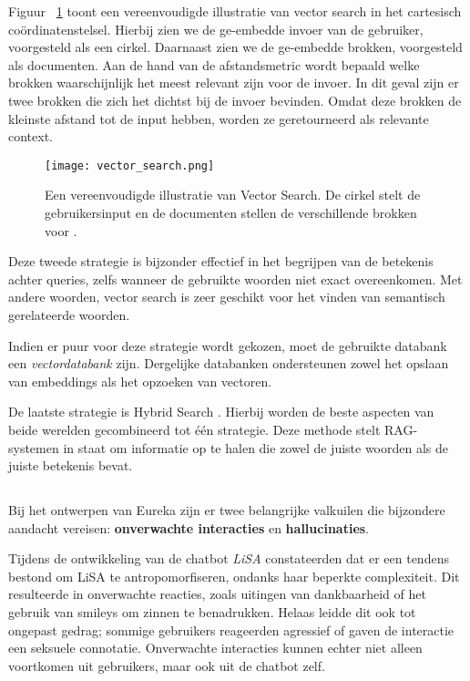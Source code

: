 Figuur ~\ref{fig:vector_search} toont een vereenvoudigde illustratie van vector search in het cartesisch coördinatenstelsel. Hierbij zien we de ge-embedde invoer van de gebruiker, voorgesteld als een cirkel. Daarnaast zien we de ge-embedde brokken, voorgesteld als documenten. Aan de hand van de afstandsmetric wordt bepaald welke brokken waarschijnlijk het meest relevant zijn voor de invoer. In dit geval zijn er twee brokken die zich het dichtst bij de invoer bevinden. Omdat deze brokken de kleinste afstand tot de input hebben, worden ze geretourneerd als relevante context.

\begin{figure}
    \centering
    \texttt{[image: vector\_search.png]}
    \caption[Vulgarisatie van Embbe Search in het cartesisch coördinatenstelsel]{\label{fig:vector_search}Een vereenvoudigde illustratie van Vector Search. De cirkel stelt de gebruikersinput en de documenten stellen de verschillende brokken voor \autocite{Vespa2023}.}
\end{figure}
        
Deze tweede strategie is bijzonder effectief in het begrijpen van de betekenis achter queries, zelfs wanneer de gebruikte woorden niet exact overeenkomen. Met andere woorden, vector search is zeer geschikt voor het vinden van semantisch gerelateerde woorden.

Indien er puur voor deze strategie wordt gekozen, moet de gebruikte databank een \textit{vectordatabank} zijn. Dergelijke databanken ondersteunen zowel het opslaan van embeddings als het opzoeken van vectoren.

De laatste strategie is Hybrid Search \autocite{Bansal2023}. Hierbij worden de beste aspecten van beide werelden gecombineerd tot één strategie. Deze methode stelt RAG-systemen in staat om informatie op te halen die zowel de juiste woorden als de juiste betekenis bevat. 

\subsection{}%
\label{subsec:valkuilen}

Bij het ontwerpen van Eureka zijn er twee belangrijke valkuilen die bijzondere aandacht vereisen: \textbf{onverwachte interacties} en \textbf{hallucinaties}.

Tijdens de ontwikkeling van de chatbot \textit{LiSA} constateerden \textcite{Dibitonto2018} dat er een tendens bestond om LiSA te antropomorfiseren, ondanks haar beperkte complexiteit. Dit resulteerde in onverwachte reacties, zoals uitingen van dankbaarheid of het gebruik van smileys om zinnen te benadrukken. Helaas leidde dit ook tot ongepast gedrag; sommige gebruikers reageerden agressief of gaven de interactie een seksuele connotatie. Onverwachte interacties kunnen echter niet alleen voortkomen uit gebruikers, maar ook uit de chatbot zelf.

